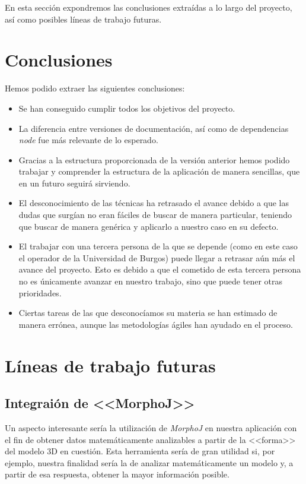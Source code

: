 En esta sección expondremos las conclusiones extraídas a lo largo del proyecto, así como posibles líneas de trabajo futuras.

\section{Conclusiones}
Hemos podido extraer las siguientes conclusiones:

\begin{itemize}
	\item Se han conseguido cumplir todos los objetivos del proyecto.
	\item La diferencia entre versiones de documentación, así como de dependencias \textit{node} fue más relevante de lo esperado.
	\item Gracias a la estructura proporcionada de la versión anterior hemos podido trabajar y comprender la estructura de la aplicación de manera sencillas, que en un futuro seguirá sirviendo.
	\item El desconocimiento de las técnicas ha retrasado el avance debido a que las dudas que surgían no eran fáciles de buscar de manera particular, teniendo que buscar de manera genérica y aplicarlo a nuestro caso en su defecto.
	\item El trabajar con una tercera persona de la que se depende (como en este caso el operador de la Universidad de Burgos) puede llegar a retrasar aún más el avance del proyecto. Esto es debido a que el cometido de esta tercera persona no es únicamente avanzar en nuestro trabajo, sino que puede tener otras prioridades.
	\item Ciertas tareas de las que desconocíamos su materia se han estimado de manera errónea, aunque las metodologías ágiles han ayudado en el proceso.
\end{itemize}
\section{Líneas de trabajo futuras}

\subsection{Integraión de <<MorphoJ>>}
Un aspecto interesante sería la utilización de \textit{MorphoJ} en nuestra aplicación con el fin de obtener datos matemáticamente analizables a partir de la <<forma>> del modelo 3D en cuestión. Esta herramienta sería de gran utilidad si, por ejemplo, nuestra finalidad sería la de analizar matemáticamente un modelo y, a partir de esa respuesta, obtener la mayor información posible.

